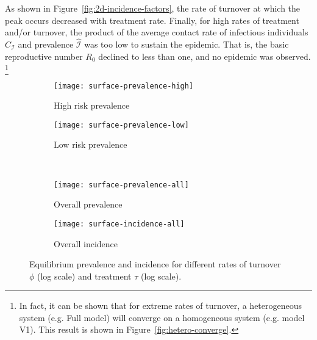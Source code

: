 As shown in Figure~\ref{fig:2d-incidence-factors},
the rate of turnover at which the peak occurs decreased with treatment rate.
Finally, for high rates of treatment and/or turnover, the product of
the average contact rate of infectious individuals $\hat{C}_\mathcal{I}$
and prevalence $\hat{\mathcal{I}}$
was too low to sustain the epidemic.
That is, the basic reproductive number $R_0$ declined to less than one,
and no epidemic was  observed.%
\footnote{In fact, it can be shown that for extreme rates of turnover,
  a heterogeneous system (e.g. Full model) will converge on
  a homogeneous system (e.g. model V1).
  This result is shown in Figure~\ref{fig:hetero-converge}.}
\begin{figure}[!tbp]
  \centering
  \begin{subfigure}{0.45\linewidth}
    \centering
    \texttt{[image: surface-prevalence-high]}
    \caption{High risk prevalence}
    \label{fig:surface-prevalence-high}
  \end{subfigure}
  \begin{subfigure}{0.45\linewidth}
    \centering
    \texttt{[image: surface-prevalence-low]}
    \caption{Low risk prevalence}
    \label{fig:surface-prevalence-low}
  \end{subfigure}\\[1em]
  \begin{subfigure}{0.45\linewidth}
    \centering
    \texttt{[image: surface-prevalence-all]}
    \caption{Overall prevalence}
    \label{fig:surface-prevalence-all}
  \end{subfigure}
  \begin{subfigure}{0.45\linewidth}
    \centering
    \texttt{[image: surface-incidence-all]}
    \caption{Overall incidence}
    \label{fig:surface-incidence-all}
  \end{subfigure}
  \caption{Equilibrium prevalence and incidence for different rates of
    turnover $\phi$ (log scale) and
    treatment $\tau$ (log scale).}
  \label{fig:surface}
\end{figure}
